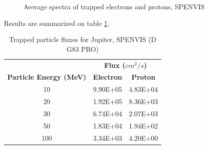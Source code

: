 \begin{figure}[htb!]
\captionsetup[subfigure]{width=0.45\textwidth}
 
\caption{Average spectra of trapped electrons and protons, SPENVIS}
\label{fig:eleprotflux}
\end{figure}
Results are summarized on table \ref{tab:particleflux}. 

\begin{table}[htb]
  \centering
    \begin{tabular}{|c|c|c|}
    \hline
    \textbf{} & \multicolumn{2}{c|}{\textbf{Flux ($cm^2/s$)}} \bigstrut\\
\cline{2-3}    \textbf{Particle Energy (MeV)} & \textbf{Electron} & \textbf{Proton} \bigstrut\\
    \hline
    10    & 9.90E+05 & 4.83E+04 \bigstrut\\
    \hline
    20    & 1.92E+05 & 8.36E+03 \bigstrut\\
    \hline
    30    & 6.74E+04 & 2.07E+03 \bigstrut\\
    \hline
    50    & 1.83E+04 & 1.94E+02 \bigstrut\\
    \hline
    100   & 3.34E+03 & 4.20E+00 \bigstrut\\
    \hline
    \end{tabular}%
    \caption{Trapped particle fluxes for Jupiter, SPENVIS (D G83 PRO)}
    \label{tab:particleflux}
\end{table}%

